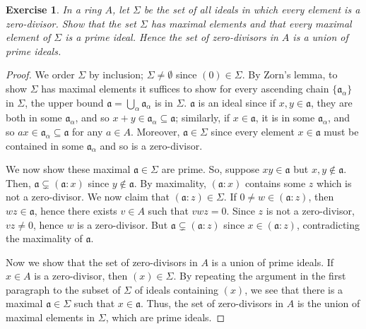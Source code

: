 \documentclass[12pt,letterpaper]{article}
\newtheorem{problem}{Exercise}[section]
\theoremstyle{definition}
\theoremstyle{remark}
\numberwithin{figure}{problem}
\numberwithin{equation}{section}
\begin{document}
\begin{problem}
  In a ring $A$, let $\Sigma$ be the set of all ideals in which every element is a zero-divisor. Show that the set $\Sigma$ has maximal elements and that every maximal element of $\Sigma$ is a prime ideal. Hence the set of zero-divisors in $A$ is a union of prime ideals.
\end{problem}
\begin{proof}
  We order $\Sigma$ by inclusion; $\Sigma \ne \emptyset$ since $(0) \in \Sigma$. By Zorn's lemma, to show $\Sigma$ has maximal elements it suffices to show for every ascending chain $\{\mathfrak{a}_\alpha\}$ in $\Sigma$, the upper bound $\mathfrak{a} = \bigcup_\alpha \mathfrak{a}_\alpha$ is in $\Sigma$. $\mathfrak{a}$ is an ideal since if $x,y \in \mathfrak{a}$, they are both in some $\mathfrak{a}_\alpha$, and so $x+y \in \mathfrak{a}_\alpha \subseteq \mathfrak{a}$; similarly, if $x \in \mathfrak{a}$, it is in some $\mathfrak{a}_\alpha$, and so $ax \in \mathfrak{a}_\alpha \subseteq \mathfrak{a}$ for any $a \in A$. Moreover, $\mathfrak{a} \in \Sigma$ since every element $x \in \mathfrak{a}$ must be contained in some $\mathfrak{a}_\alpha$ and so is a zero-divisor.
  \par We now show these maximal $\mathfrak{a} \in \Sigma$ are prime. So, suppose $xy \in \mathfrak{a}$ but $x,y \notin \mathfrak{a}$. Then, $\mathfrak{a} \subsetneq (\mathfrak{a} : x)$ since $y \notin \mathfrak{a}$. By maximality, $(\mathfrak{a} : x)$ contains some $z$ which is not a zero-divisor. We now claim that $(\mathfrak{a} : z) \in \Sigma$. If $0 \ne w \in (\mathfrak{a} : z)$, then $wz \in \mathfrak{a}$, hence there exists $v \in A$ such that $vwz = 0$. Since $z$ is not a zero-divisor, $vz \ne 0$, hence $w$ is a zero-divisor. But $\mathfrak{a} \subsetneq (\mathfrak{a} : z)$ since $x \in (\mathfrak{a} : z)$, contradicting the maximality of $\mathfrak{a}$.
  \par Now we show that the set of zero-divisors in $A$ is a union of prime ideals. If $x \in A$ is a zero-divisor, then $(x) \in \Sigma$. By repeating the argument in the first paragraph to the subset of $\Sigma$ of ideals containing $(x)$, we see that there is a maximal $\mathfrak{a} \in \Sigma$ such that $x \in \mathfrak{a}$. Thus, the set of zero-divisors in $A$ is the union of maximal elements in $\Sigma$, which are prime ideals.
\end{proof}
\end{document}
